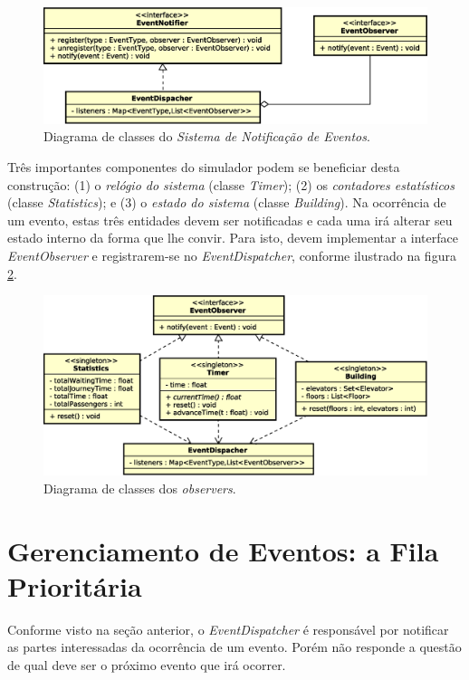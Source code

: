 \begin{figure}[htb!]
  \centering
  \includegraphics[scale=0.6]{img/notification.eps}
  \caption{Diagrama de classes do \textit{Sistema de Notificação de Eventos}.}
\label{fig:diagram:notification}
\end{figure}

Três importantes componentes do simulador podem se beneficiar desta construção:
(1) o \textit{relógio do sistema} (classe \textit{Timer}); (2) os
\textit{contadores estatísticos} (classe \textit{Statistics}); e (3) o
\textit{estado do sistema} (classe \textit{Building}). Na ocorrência de um
evento, estas três entidades devem ser notificadas e cada uma irá alterar seu
estado interno da forma que lhe convir. Para isto, devem implementar a interface
\textit{EventObserver} e registrarem-se no \textit{EventDispatcher}, conforme
ilustrado na figura \ref{fig:diagram:observers}.

\begin{figure}[htb!]
  \centering
  \includegraphics[scale=0.6]{img/observers.eps}
  \caption{Diagrama de classes dos \textit{observers}.}
\label{fig:diagram:observers}
\end{figure}

\section{Gerenciamento de Eventos: a Fila Prioritária}

Conforme visto na seção anterior, o \textit{EventDispatcher} é responsável por
notificar as partes interessadas da ocorrência de um evento. Porém não responde
a questão de qual deve ser o próximo evento que irá ocorrer.

